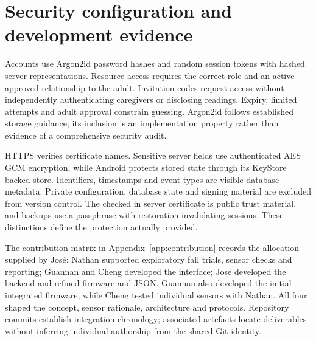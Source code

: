 \section{Security configuration and development evidence}
\label{sec:security}
\begin{reportprose}
Accounts use Argon2id password hashes and random session tokens with hashed server representations. Resource access requires the correct role and an active approved relationship to the adult. Invitation codes request access without independently authenticating caregivers or disclosing readings. Expiry, limited attempts and adult approval constrain guessing. Argon2id follows established storage guidance; its inclusion is an implementation property rather than evidence of a comprehensive security audit.\cite{owasp}

HTTPS verifies certificate names. Sensitive server fields use authenticated AES GCM encryption, while Android protects stored state through its KeyStore backed store. Identifiers, timestamps and event types are visible database metadata. Private configuration, database state and signing material are excluded from version control. The checked in server certificate is public trust material, and backups use a passphrase with restoration invalidating sessions. These distinctions define the protection actually provided.

The contribution matrix in Appendix~\ref{app:contribution} records the allocation supplied by Jos\'e: Nathan supported exploratory fall trials, sensor checks and reporting; Guannan and Cheng developed the interface; Jos\'e developed the backend and refined firmware and JSON. Guannan also developed the initial integrated firmware, while Cheng tested individual sensors with Nathan. All four shaped the concept, sensor rationale, architecture and protocols. Repository commits establish integration chronology; associated artefacts locate deliverables without inferring individual authorship from the shared Git identity.\cite{teamcontributions,git}
\end{reportprose}

